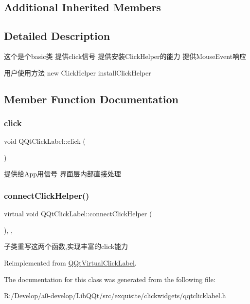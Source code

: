 \subsection*{Additional Inherited Members}


\subsection{Detailed Description}
这个是个basic类 提供click信号 提供安装\+Click\+Helper的能力 提供\+Mouse\+Event响应

用户使用方法 new Click\+Helper install\+Click\+Helper 

\subsection{Member Function Documentation}
\mbox{\label{class_q_qt_click_label_ac17f346ad5ce4ec153eee2b66ed84663}} 
\subsubsection{\texorpdfstring{click}{click}}
{\footnotesize\ttfamily void Q\+Qt\+Click\+Label\+::click (\begin{DoxyParamCaption}{ }\end{DoxyParamCaption})\hspace{0.3cm}{\ttfamily [signal]}}

提供给\+App用信号 界面层内部直接处理 \mbox{\label{class_q_qt_click_label_af20a13941a73c08287b01642a9e126a9}} 
\subsubsection{\texorpdfstring{connect\+Click\+Helper()}{connectClickHelper()}}
{\footnotesize\ttfamily virtual void Q\+Qt\+Click\+Label\+::connect\+Click\+Helper (\begin{DoxyParamCaption}{ }\end{DoxyParamCaption})\hspace{0.3cm}{\ttfamily [inline]}, {\ttfamily [protected]}, {\ttfamily [virtual]}}

子类重写这两个函数,实现丰富的click能力 

Reimplemented from \mbox{\hyperlink{class_q_qt_virtual_click_label_a6e008887a4f2d5287e329a53caf8222c}{Q\+Qt\+Virtual\+Click\+Label}}.



The documentation for this class was generated from the following file\+:\begin{DoxyCompactItemize}
\item 
R\+:/\+Develop/a0-\/develop/\+Lib\+Q\+Qt/src/exquisite/clickwidgets/qqtclicklabel.\+h\end{DoxyCompactItemize}
